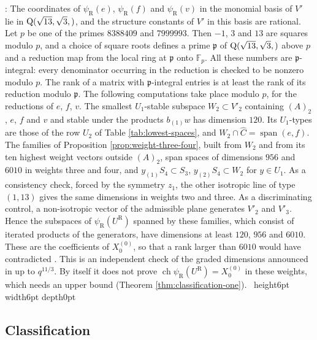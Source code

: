 \documentclass[leqno]{article}
\newcommand{\Q}{\mathrm{Q}}
\newcommand{\qed}{\hfill \vrule height6pt  width6pt depth0pt}
\let\i\relax
\newcommand{\i}{\mathrm{i}}
\newenvironment{proof}[1][]{\noindent {\it Proof #1} : }{\hbox{~}\qed
\smallskip
}
\numberwithin{equation}{section}
\begin{document}
\begin{proof}
The coordinates of $\psi_{\mathrm R}(e)$, $\psi_{\mathrm R}(f)$ and $\psi_{\mathrm R}(v)$ in the monomial basis of $V'$ lie in $\Q(\sqrt{13},\sqrt 3,\i)$, and the structure constants of $V'$ in this basis are rational. Let $p$ be one of the primes $8388409$ and $7999993$. Then $-1$, $3$ and $13$ are squares modulo $p$, and a choice of square roots defines a prime $\mathfrak p$ of $\Q(\sqrt{13},\sqrt 3,\i)$ above $p$ and a reduction map from the local ring at $\mathfrak p$ onto $\mathbb F_p$. All these numbers are $\mathfrak p$-integral: every denominator occurring in the reduction is checked to be nonzero modulo $p$. The rank of a matrix with $\mathfrak p$-integral entries is at least the rank of its reduction modulo $\mathfrak p$. The following computations take place modulo $p$, for the reductions of $e$, $f$, $v$. The smallest $U_1$-stable subspace $W_2 \subset V'_2$ containing $(A)_2$, $e$, $f$ and $v$ and stable under the products $b_{(1)}w$ has dimension $120$. Its $U_1$-types are those of the row $U_2$ of Table \ref{tab:lowest-spaces}, and $W_2 \cap \widehat C = \operatorname{span}(e,f)$. The families of Proposition \ref{prop:weight-three-four}, built from $W_2$ and from its ten highest weight vectors outside $(A)_2$, span spaces of dimensions $956$ and $6010$ in weights three and four, and $y_{(1)}S_4 \subset S_3$, $y_{(2)}S_4 \subset W_2$ for $y \in U_1$. As a consistency check, forced by the symmetry $z_1$, the other isotropic line of type $(1,13)$ gives the same dimensions in weights two and three. As a discriminating control, a non-isotropic vector of the admissible plane generates $V'_2$ and $V'_3$. Hence the subspaces of $\psi_{\mathrm R}(U^{\mathrm R})$ spanned by these families, which consist of iterated products of the generators, have dimensions at least $120$, $956$ and $6010$. These are the coefficients of $X^{(0)}_0$, so that a rank larger than $6010$ would have contradicted \cite{Rie26}. This is an independent check of the graded dimensions announced in \cite{Rie26} up to $q^{11/3}$. By itself it does not prove $\operatorname{ch}\psi_{\mathrm R}(U^{\mathrm R}) = X^{(0)}_0$ in these weights, which needs an upper bound (Theorem \ref{thm:classification-one}).
\end{proof}

\subsection{Classification}
\label{subsec:classification}
\end{document}
